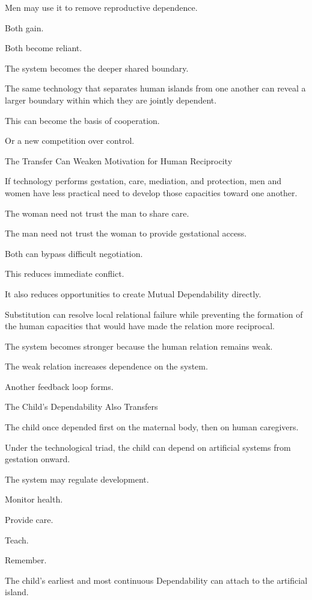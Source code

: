 Men may use it to remove reproductive dependence.

Both gain.

Both become reliant.

The system becomes the deeper shared boundary.

The same technology that separates human islands from one another can reveal a larger boundary within which they are jointly dependent.

This can become the basis of cooperation.

Or a new competition over control.

The Transfer Can Weaken Motivation for Human Reciprocity

If technology performs gestation, care, mediation, and protection, men and women have less practical need to develop those capacities toward one another.

The woman need not trust the man to share care.

The man need not trust the woman to provide gestational access.

Both can bypass difficult negotiation.

This reduces immediate conflict.

It also reduces opportunities to create Mutual Dependability directly.

Substitution can resolve local relational failure while preventing the formation of the human capacities that would have made the relation more reciprocal.

The system becomes stronger because the human relation remains weak.

The weak relation increases dependence on the system.

Another feedback loop forms.

The Child’s Dependability Also Transfers

The child once depended first on the maternal body, then on human caregivers.

Under the technological triad, the child can depend on artificial systems from gestation onward.

The system may regulate development.

Monitor health.

Provide care.

Teach.

Remember.

The child’s earliest and most continuous Dependability can attach to the artificial island.

